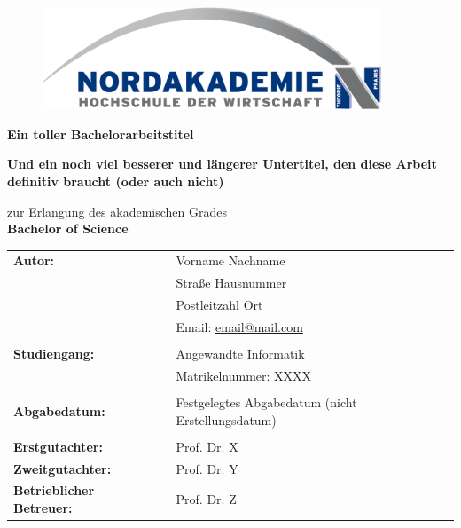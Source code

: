 \thispagestyle{empty}

\vspace{1.5cm}

\begin{figure}[h]
    \centering
    \includegraphics[width=0.9\textwidth]{dokumente/bilder/Nordakademie_Logo_gross.jpg}
\end{figure}

\vspace{2.5cm}

\begin{center}
    \textbf{\Huge{Ein toller Bachelorarbeitstitel}}

    \textbf{\Large{Und ein noch viel besserer und längerer Untertitel, den diese Arbeit definitiv braucht (oder auch nicht)}}
\end{center}

\vspace{1.5cm}

\begin{center}
    zur Erlangung des akademischen Grades\\
    \textbf{\large{Bachelor of Science}}
\end{center}

\vspace{4.0cm}

\begin{flushleft}
    \begin{tabular}{llll}
        \textbf{Autor:} & & Vorname Nachname & \\
        & & Straße Hausnummer & \\
        & & Postleitzahl Ort & \\
        & & Email: \href{mailto:email@mail.com}{email@mail.com} & \\
        & & \\
        \textbf{Studiengang:} & & Angewandte Informatik & \\
        & & Matrikelnummer: XXXX & \\ 
        & & \\
        \textbf{Abgabedatum:} & & Festgelegtes Abgabedatum (nicht Erstellungsdatum) &\\
        & & \\
        \textbf{Erstgutachter:} & & Prof. Dr. X &\\
        \textbf{Zweitgutachter:} & & Prof. Dr. Y &\\
        \textbf{Betrieblicher Betreuer:} & & Prof. Dr. Z &\\
    \end{tabular}
\end{flushleft}

\pagebreak